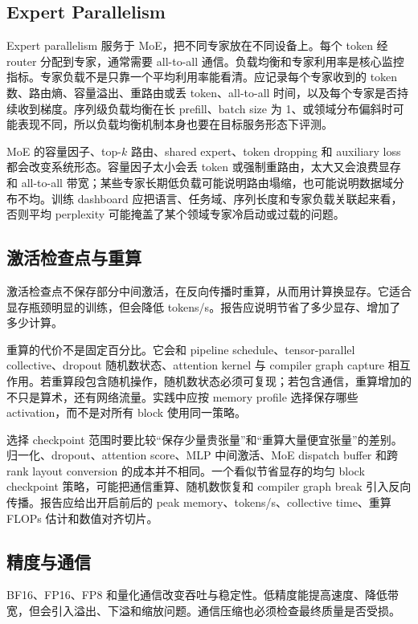 \documentclass[UTF8,zihao=-4,openany]{ctexbook}
\begin{document}
\subsection{Expert Parallelism}
Expert parallelism 服务于 MoE，把不同专家放在不同设备上。每个 token 经 router 分配到专家，通常需要 all-to-all 通信。负载均衡和专家利用率是核心监控指标。专家负载不是只靠一个平均利用率能看清。应记录每个专家收到的 token 数、路由熵、容量溢出、重路由或丢 token、all-to-all 时间，以及每个专家是否持续收到梯度。序列级负载均衡在长 prefill、batch size 为 1、或领域分布偏斜时可能表现不同，所以负载均衡机制本身也要在目标服务形态下评测。

MoE 的容量因子、top-$k$ 路由、shared expert、token dropping 和 auxiliary loss 都会改变系统形态。容量因子太小会丢 token 或强制重路由，太大又会浪费显存和 all-to-all 带宽；某些专家长期低负载可能说明路由塌缩，也可能说明数据域分布不均。训练 dashboard 应把语言、任务域、序列长度和专家负载关联起来看，否则平均 perplexity 可能掩盖了某个领域专家冷启动或过载的问题。

\subsection{激活检查点与重算}
激活检查点不保存部分中间激活，在反向传播时重算，从而用计算换显存。它适合显存瓶颈明显的训练，但会降低 tokens/s。报告应说明节省了多少显存、增加了多少计算。

重算的代价不是固定百分比。它会和 pipeline schedule、tensor-parallel collective、dropout 随机数状态、attention kernel 与 compiler graph capture 相互作用。若重算段包含随机操作，随机数状态必须可复现；若包含通信，重算增加的不只是算术，还有网络流量。实践中应按 memory profile 选择保存哪些 activation，而不是对所有 block 使用同一策略。

选择 checkpoint 范围时要比较“保存少量贵张量”和“重算大量便宜张量”的差别。归一化、dropout、attention score、MLP 中间激活、MoE dispatch buffer 和跨 rank layout conversion 的成本并不相同。一个看似节省显存的均匀 block checkpoint 策略，可能把通信重算、随机数恢复和 compiler graph break 引入反向传播。报告应给出开启前后的 peak memory、tokens/s、collective time、重算 FLOPs 估计和数值对齐切片。

\subsection{精度与通信}
BF16、FP16、FP8 和量化通信改变吞吐与稳定性。低精度能提高速度、降低带宽，但会引入溢出、下溢和缩放问题。通信压缩也必须检查最终质量是否受损。
\end{document}
